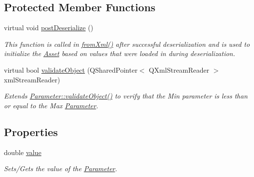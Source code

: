 \subsection*{Protected Member Functions}
\begin{DoxyCompactItemize}
\item 
virtual void \hyperlink{class_picto_1_1_double_parameter_a9bc0ba6583175dfc34736098ca496fd0}{post\-Deserialize} ()
\begin{DoxyCompactList}\small\item\em This function is called in \hyperlink{class_picto_1_1_asset_a8bed4da09ecb1c07ce0dab313a9aba67}{from\-Xml()} after successful deserialization and is used to initialize the \hyperlink{class_picto_1_1_asset}{Asset} based on values that were loaded in during deserialization. \end{DoxyCompactList}\item 
\hypertarget{class_picto_1_1_double_parameter_a9c0c23222d1dacbe7f4a8d0914c52188}{virtual bool \hyperlink{class_picto_1_1_double_parameter_a9c0c23222d1dacbe7f4a8d0914c52188}{validate\-Object} (Q\-Shared\-Pointer$<$ Q\-Xml\-Stream\-Reader $>$ xml\-Stream\-Reader)}\label{class_picto_1_1_double_parameter_a9c0c23222d1dacbe7f4a8d0914c52188}

\begin{DoxyCompactList}\small\item\em Extends \hyperlink{class_picto_1_1_parameter_a94c0e4191ffcc0bd642b647d24557082}{Parameter\-::validate\-Object()} to verify that the Min parameter is less than or equal to the Max \hyperlink{class_picto_1_1_parameter}{Parameter}. \end{DoxyCompactList}\end{DoxyCompactItemize}
\subsection*{Properties}
\begin{DoxyCompactItemize}
\item 
\hypertarget{class_picto_1_1_double_parameter_a6217f0440779497b46c72ab8abb665ef}{double \hyperlink{class_picto_1_1_double_parameter_a6217f0440779497b46c72ab8abb665ef}{value}}\label{class_picto_1_1_double_parameter_a6217f0440779497b46c72ab8abb665ef}

\begin{DoxyCompactList}\small\item\em Sets/\-Gets the value of the \hyperlink{class_picto_1_1_parameter}{Parameter}. \end{DoxyCompactList}\end{DoxyCompactItemize}
